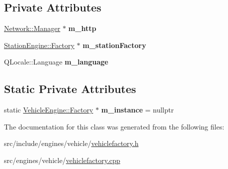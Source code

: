 \subsection*{Private Attributes}
\begin{DoxyCompactItemize}
\item 
\mbox{\label{classVehicleEngine_1_1Factory_a7db189c0fa5d68eda7f90ffd0d4ed48f}} 
\mbox{\hyperlink{classNetwork_1_1Manager}{Network\+::\+Manager}} $\ast$ {\bfseries m\+\_\+http}
\item 
\mbox{\label{classVehicleEngine_1_1Factory_a2f8e99563781a2901e4814d262453871}} 
\mbox{\hyperlink{classStationEngine_1_1Factory}{Station\+Engine\+::\+Factory}} $\ast$ {\bfseries m\+\_\+station\+Factory}
\item 
\mbox{\label{classVehicleEngine_1_1Factory_a00ca9db84ea9227d62d201479a9342ff}} 
Q\+Locale\+::\+Language {\bfseries m\+\_\+language}
\end{DoxyCompactItemize}
\subsection*{Static Private Attributes}
\begin{DoxyCompactItemize}
\item 
\mbox{\label{classVehicleEngine_1_1Factory_a000d443fa44673ab1931a2fa5c1a786c}} 
static \mbox{\hyperlink{classVehicleEngine_1_1Factory}{Vehicle\+Engine\+::\+Factory}} $\ast$ {\bfseries m\+\_\+instance} = nullptr
\end{DoxyCompactItemize}


The documentation for this class was generated from the following files\+:\begin{DoxyCompactItemize}
\item 
src/include/engines/vehicle/\mbox{\hyperlink{vehiclefactory_8h}{vehiclefactory.\+h}}\item 
src/engines/vehicle/\mbox{\hyperlink{vehiclefactory_8cpp}{vehiclefactory.\+cpp}}\end{DoxyCompactItemize}
